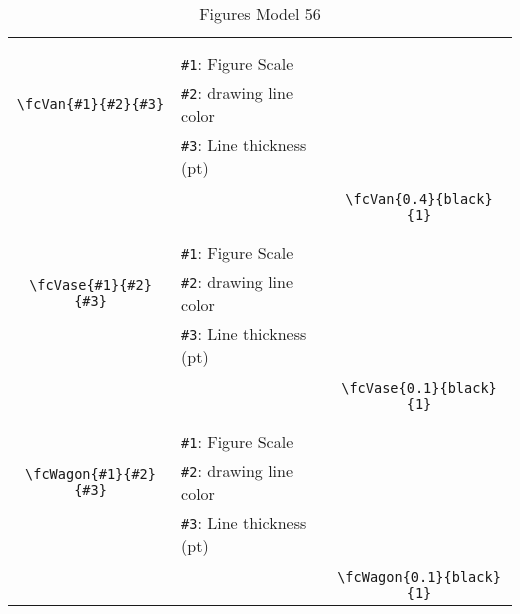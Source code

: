 \documentclass[x11names]{article}
\begin{document}
\begin{table}[H]
\begin{tabular}{|c|l|c|}
	&&\multirow{5}{*}{\fcVan{0.4}{black}{1}}\\	&&\\	&\verb|#1|: Figure Scale &\\	\verb|\fcVan{#1}{#2}{#3}|&	\verb|#2|: drawing line color &\\	&\verb|#3|: Line thickness (pt) &\\ &&\\&&	\verb|\fcVan{0.4}{black}{1}|\\\hline 	
	&&\multirow{5}{*}{\fcVase{0.1}{black}{1}}\\	&&\\	&\verb|#1|: Figure Scale &\\	\verb|\fcVase{#1}{#2}{#3}|&	\verb|#2|: drawing line color &\\	&\verb|#3|: Line thickness (pt) &\\ &&\\&&	\verb|\fcVase{0.1}{black}{1}|\\\hline 	
	&&\multirow{5}{*}{\fcWagon{0.1}{black}{1}}\\	&&\\	&\verb|#1|: Figure Scale &\\	\verb|\fcWagon{#1}{#2}{#3}|&	\verb|#2|: drawing line color &\\	&\verb|#3|: Line thickness (pt) &\\ &&\\&&	\verb|\fcWagon{0.1}{black}{1}|\\\hline 	\hline\end{tabular}\caption{Figures Model 56}\label{tab56}\end{table}
\end{document}
